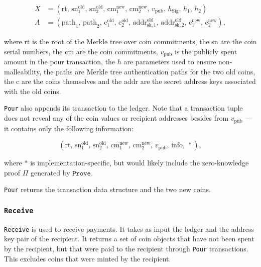 \documentclass{article}
\begin{document}
\begin{align}
X &= \left( \text{rt}, \, {\text{sn}}^{\text{old}}_1, \, {\text{sn}}^{\text{old}}_2, \, {\text{cm}}^{\text{new}}_1, \, {\text{cm}}^{\text{new}}_2, \, v_{\text{pub}}, \, h_{\text{Sig}}, \, h_1, \, h_2 \right) \\ 
A &= \left( \text{path}_1, \, \text{path}_2, \, {\text{c}}^{\text{old}}_1, \, {\text{c}}^{\text{old}}_2, \, {\text{addr}}^{\text{old}}_{\text{sk}, 1}, \, {\text{addr}}^{\text{old}}_{\text{sk}, 2}, \, {\text{c}}^{\text{new}}_1, \, {\text{c}}^{\text{new}}_2 \right),
\end{align}
\newline

where rt is the root of the Merkle tree over coin commitments, the sn are the coin serial numbers, the cm are the coin commitments, $v_{\text{pub}}$ is the publicly spent amount in the pour transaction, the $h$ are parameters used to ensure non-malleability, the paths are Merkle tree authentication paths for the two old coins, the c are the coins themselves and the addr are the secret address keys associated with the old coins.

\texttt{Pour} also appends its transaction to the ledger. Note that a transaction tuple does not reveal any of the coin values or recipient addresses besides from $v_{\text{pub}}$ --- it contains only the following information: 

\begin{equation}
\left(\text{rt}, \, {\text{sn}}^{\text{old}}_1, \, {\text{sn}}^{\text{old}}_2, \, {\text{cm}}^{\text{new}}_1, \, {\text{cm}}^{\text{new}}_2, \, v_{\text{pub}}, \, \text{info}, \, *\right),
\end{equation}


where $*$ is implementation-specific, but would likely include the zero-knowledge proof $\Pi$ generated by $\texttt{Prove}$.

\texttt{Pour} returns the transaction data structure and the two new coins.

\subsubsection{\texttt{Receive}}
\texttt{Receive} is used to receive payments. It takes as input the ledger and the address key pair of the recipient. It returns a set of coin objects that have not been spent by the recipient, but that were paid to the recipient through \texttt{Pour} transactions. This excludes coins that were minted by the recipient.
\end{document}
